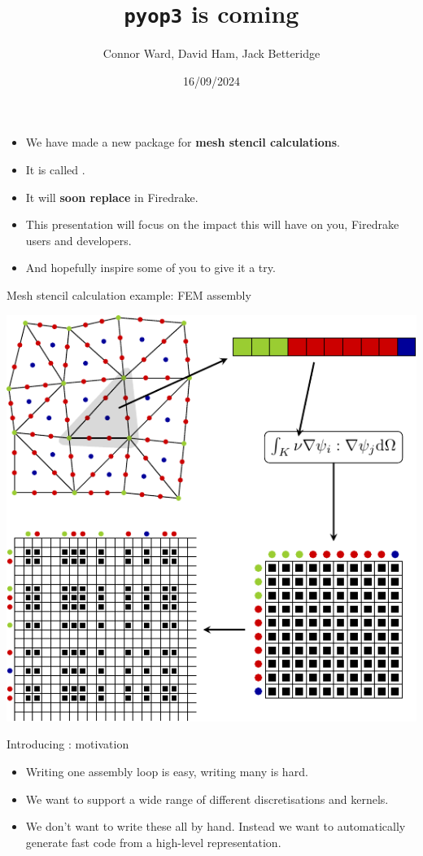 \documentclass[aspectratio=169]{beamer}
\title{\texttt{pyop3} is coming}
\author{Connor Ward, David Ham, Jack Betteridge}
\date{16/09/2024}
\begin{document}
\frame{\titlepage}

\begin{frame}
  \begin{itemize}
    \item
      We have made a new package for \textbf{mesh stencil calculations}.
    \item
      It is called .
    \item
      It will \textbf{soon replace } in Firedrake.
    \item
      This presentation will focus on the impact this will have on you, Firedrake users and developers.
    \item
      And hopefully inspire some of you to give it a try.
  \end{itemize}
\end{frame}

\begin{frame}{Mesh stencil calculation example: FEM assembly}
  \vspace{-1em}
  \begin{center}
    \includegraphics[scale=.8]{fem_assembly.pdf}
  \end{center}
\end{frame}

\begin{frame}{Introducing : motivation}
  \begin{itemize}
    \item 
      Writing one assembly loop is easy, writing many is hard.
    \item
      We want to support a wide range of different discretisations and kernels.
    \item
      We don't want to write these all by hand. Instead we want to automatically generate fast code from a high-level representation.
  \end{itemize}
\end{frame}
\end{document}

